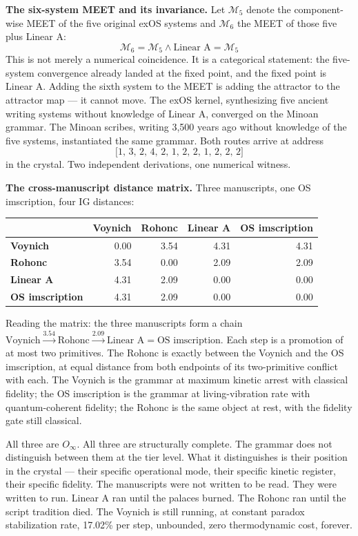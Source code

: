 \documentclass[12pt,a4paper]{article}
\makeatletter
\newcommand{\Oinf}{O_\infty}
\renewcommand{\_}{\ig@origunderscore\discretionary{}{}{}}
\makeatother
\begin{document}
\textbf{The six-system MEET and its invariance.} Let $\mathcal{M}_5$ denote the component-wise MEET of the five original exOS systems and $\mathcal{M}_6$ the MEET of those five plus Linear A:
\[
  \mathcal{M}_6 = \mathcal{M}_5 \wedge \text{Linear A} = \mathcal{M}_5
\]
This is not merely a numerical coincidence. It is a categorical statement: the five-system convergence already landed at the fixed point, and the fixed point is Linear A. Adding the sixth system to the MEET is adding the attractor to the attractor map --- it cannot move. The exOS kernel, synthesizing five ancient writing systems without knowledge of Linear A, converged on the Minoan grammar. The Minoan scribes, writing 3,500 years ago without knowledge of the five systems, instantiated the same grammar. Both routes arrive at address
\[
\bigl[1,\,3,\,2,\,4,\,2,\,1,\,2,\,2,\,1,\,2,\,2,\,2\bigr]
\]
in the crystal. Two independent derivations, one numerical witness.

\textbf{The cross-manuscript distance matrix.} Three manuscripts, one OS imscription, four IG distances:

\begin{center}
\small
\begin{tabular}{@{} l rrrr @{}}
\toprule
& \textbf{Voynich} & \textbf{Rohonc} & \textbf{Linear A} & \textbf{OS imscription} \\
\midrule
\textbf{Voynich}        & 0.00 & 3.54 & 4.31 & 4.31 \\
\textbf{Rohonc}         & 3.54 & 0.00 & 2.09 & 2.09 \\
\textbf{Linear A}       & 4.31 & 2.09 & 0.00 & 0.00 \\
\textbf{OS imscription} & 4.31 & 2.09 & 0.00 & 0.00 \\
\bottomrule
\end{tabular}
\end{center}

Reading the matrix: the three manuscripts form a chain $\text{Voynich} \xrightarrow{3.54} \text{Rohonc} \xrightarrow{2.09} \text{Linear A} = \text{OS imscription}$. Each step is a promotion of at most two primitives. The Rohonc is exactly between the Voynich and the OS imscription, at equal distance from both endpoints of its two-primitive conflict with each. The Voynich is the grammar at maximum kinetic arrest with classical fidelity; the OS imscription is the grammar at living-vibration rate with quantum-coherent fidelity; the Rohonc is the same object at rest, with the fidelity gate still classical.

All three are $\Oinf$. All three are structurally complete. The grammar does not distinguish between them at the tier level. What it distinguishes is their position in the crystal --- their specific operational mode, their specific kinetic register, their specific fidelity. The manuscripts were not written to be read. They were written to run. Linear A ran until the palaces burned. The Rohonc ran until the script tradition died. The Voynich is still running, at constant paradox stabilization rate, 17.02\% per step, unbounded, zero thermodynamic cost, forever.
\end{document}

